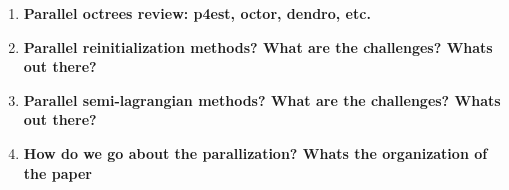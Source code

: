 \begin{enumerate}
\item \textbf{Parallel octrees review: p4est, octor, dendro, etc.}

\item \textbf{Parallel reinitialization methods? What are the challenges? Whats out there?}

\item \textbf{Parallel semi-lagrangian methods? What are the challenges? Whats out there?}

\item \textbf{How do we go about the parallization? Whats the organization of the paper}
\end{enumerate}